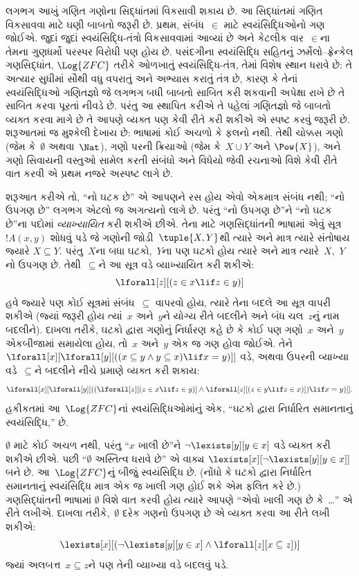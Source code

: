\begingroup
\makeatletter{}\makeatother


\label{guunit:OLP-0172}


લગભગ આખું ગણિત ગણોના સિદ્ધાંતમાં વિકસાવી શકાય છે. આ સિદ્ધાંતમાં
ગણિત વિકસાવવા માટે ઘણી બાબતો જરૂરી છે. પ્રથમ, સંબંધ~$\in$ માટે
સ્વયંસિદ્ધિઓનો ગણ જોઈએ. જુદાં જુદાં સ્વયંસિદ્ધિ-તંત્રો વિકસાવવામાં
આવ્યાં છે અને કેટલીક વાર~$\in$ના તેમના ગુણધર્મો પરસ્પર વિરોધી પણ હોય
છે. પસંદગીના સ્વયંસિદ્ધિ સહિતનું ઝર્મેલો--ફ્રેન્કેલ ગણસિદ્ધાંત,
$\Log{ZFC}$ તરીકે ઓળખાતું સ્વયંસિદ્ધિ-તંત્ર, તેમાં વિશેષ સ્થાન ધરાવે
છે: તે અત્યાર સુધીમાં સૌથી વધુ વપરાતું અને અભ્યાસ કરાતું તંત્ર છે,
કારણ કે તેનાં સ્વયંસિદ્ધિઓ ગણિતજ્ઞો જે લગભગ બધી બાબતો સાબિત કરી શકવાની
અપેક્ષા રાખે છે તે સાબિત કરવા પૂરતાં નીવડે છે. પરંતુ આ સ્થાપિત કરીએ તે
પહેલાં ગણિતજ્ઞો જે બાબતો વ્યક્ત કરવા માગે છે તે આપણે વ્યક્ત પણ કેવી
રીતે કરી શકીએ એ સ્પષ્ટ કરવું જરૂરી છે. શરૂઆતમાં જ મુશ્કેલી દેખાય છે:
ભાષામાં કોઈ અચળો કે ફલનો નથી. તેથી ચોક્કસ ગણો (જેમ
કે~$\emptyset$ અથવા~$\Nat$), ગણો પરની ક્રિયાઓ (જેમ કે~$X\cup Y$ અને
$\Pow{X}$), અને ગણો સિવાયની વસ્તુઓ સામેલ કરતી સંબંધો અને વિધેયો જેવી
રચનાઓ વિશે કેવી રીતે વાત કરવી એ પ્રથમ નજરે અસ્પષ્ટ લાગે છે.

શરૂઆત કરીએ તો, ``નો ઘટક છે'' એ આપણને રસ હોય એવો એકમાત્ર સંબંધ નથી;
``નો ઉપગણ છે'' લગભગ એટલો જ અગત્યનો લાગે છે. પરંતુ ``નો ઉપગણ છે''ને
``નો ઘટક છે''ના પદોમાં \emph{વ્યાખ્યાયિત} કરી શકીએ છીએ. તેના માટે
ગણસિદ્ધાંતની ભાષામાં એવું સૂત્ર~$!A(x,y)$ શોધવું પડે જે ગણોની
જોડી~$\tuple{X,Y}$થી ત્યારે અને માત્ર ત્યારે સંતોષાય જ્યારે
$X\subseteq Y$. પરંતુ~$X$ના બધા ઘટકો,~$Y$ના પણ ઘટકો
હોય ત્યારે અને માત્ર ત્યારે~$X$,~$Y$નો ઉપગણ છે. તેથી~$\subseteq$ને આ
સૂત્ર વડે વ્યાખ્યાયિત કરી શકીએ:
\[
\lforall[z][(z \in x \lif z \in y)]
\]
હવે જ્યારે પણ કોઈ સૂત્રમાં સંબંધ~$\subseteq$ વાપરવો હોય, ત્યારે તેના
બદલે આ સૂત્ર વાપરી શકીએ (જ્યાં જરૂરી હોય ત્યાં~$x$ અને~$y$ને યોગ્ય
રીતે બદલીને અને બંધ ચલ~$z$નું નામ બદલીને). દાખલા તરીકે, ઘટકો દ્વારા
ગણોનું નિર્ધારણ કહે છે કે કોઈ પણ ગણો~$x$ અને~$y$ એકબીજામાં સમાયેલા
હોય, તો~$x$ અને~$y$ એક જ ગણ હોવા જોઈએ. તેને
$\lforall[x][\lforall[y][((x\subseteq y\land y\subseteq x)\lif x=y)]]$
વડે, અથવા ઉપરની વ્યાખ્યા વડે~$\subseteq$ને બદલીને નીચે પ્રમાણે વ્યક્ત
કરી શકાય:
\[
\lforall[x][\lforall[y][((\lforall[z][(z \in x \lif z \in y)] \land
    \lforall[z][(z \in y \lif z \in x)]) \lif x = y)]].
\]
હકીકતમાં આ~$\Log{ZFC}$નાં સ્વયંસિદ્ધિઓમાંનું એક, ``ઘટકો દ્વારા
નિર્ધારિત સમાનતાનું સ્વયંસિદ્ધિ,'' છે.

$\emptyset$ માટે કોઈ અચળ નથી, પરંતુ ``$x$ ખાલી છે''ને
$\lnot\lexists[y][y\in x]$ વડે વ્યક્ત કરી શકીએ છીએ. પછી
``$\emptyset$ અસ્તિત્વ ધરાવે છે'' એ વાક્ય
$\lexists[x][\lnot\lexists[y][y\in x]]$ બને છે. આ~$\Log{ZFC}$નું બીજું
સ્વયંસિદ્ધિ છે. (નોંધો કે ઘટકો દ્વારા નિર્ધારિત સમાનતાનું સ્વયંસિદ્ધિ
માત્ર એક જ ખાલી ગણ હોઈ શકે એમ ફલિત કરે છે.) ગણસિદ્ધાંતની ભાષામાં
$\emptyset$ વિશે વાત કરવી હોય ત્યારે આપણે ``એવો ખાલી ગણ છે કે~\dots''
એ રીતે લખીએ. દાખલા તરીકે,~$\emptyset$ દરેક ગણનો ઉપગણ છે એ વ્યક્ત કરવા
આ રીતે લખી શકીએ:
\[
\lexists[x][(\lnot\lexists[y][y \in x] \land \lforall[z][x \subseteq
    z])]
\]
જ્યાં અલબત્ત~$x\subseteq z$ને પણ તેની વ્યાખ્યા વડે બદલવું પડે.

